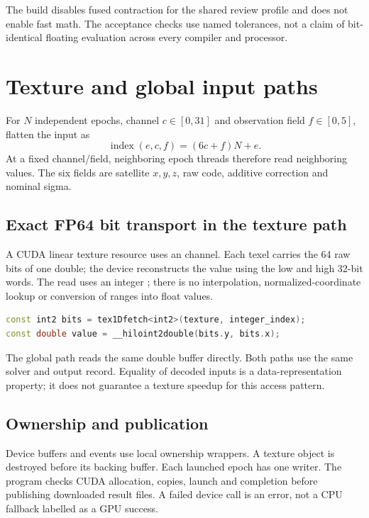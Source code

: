 The build disables fused contraction for the shared review profile and does not enable
fast math. The acceptance checks use named tolerances, not a claim of bit-identical
floating evaluation across every compiler and processor.
\clearpage

\section{Texture and global input paths}
For $N$ independent epochs, channel $c\in[0,31]$ and observation field $f\in[0,5]$,
flatten the input as
\begin{equation}
\operatorname{index}(e,c,f)=(6c+f)N+e.
\end{equation}
At a fixed channel/field, neighboring epoch threads therefore read neighboring values.
The six fields are satellite $x,y,z$, raw code, additive correction and nominal sigma.

\subsection{Exact FP64 bit transport in the texture path}
A CUDA linear texture resource uses an  channel. Each texel carries the
64 raw bits of one double; the device reconstructs the value using the low and high
32-bit words. The read uses an integer ; there is no interpolation,
normalized-coordinate lookup or conversion of ranges into float values.

\begin{lstlisting}[language=C++]
const int2 bits = tex1Dfetch<int2>(texture, integer_index);
const double value = __hiloint2double(bits.y, bits.x);
\end{lstlisting}
The global path reads the same double buffer directly. Both paths use the same solver
and output record. Equality of decoded inputs is a data-representation property; it
does not guarantee a texture speedup for this access pattern.

\subsection{Ownership and publication}
Device buffers and events use local ownership wrappers. A texture object is destroyed
before its backing buffer. Each launched epoch has one writer. The program checks CUDA
allocation, copies, launch and completion before publishing downloaded result files.
A failed device call is an error, not a CPU fallback labelled as a GPU success.

